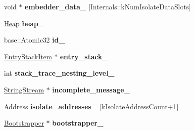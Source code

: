 \begin{DoxyCompactItemize}
\item 
void $\ast$ {\bfseries embedder\+\_\+data\+\_\+} \mbox{[}Internals\+::k\+Num\+Isolate\+Data\+Slots\mbox{]}\hypertarget{classv8_1_1internal_1_1_isolate_a6bda52e977da4e20fbc79e25a6b5922b}{}\label{classv8_1_1internal_1_1_isolate_a6bda52e977da4e20fbc79e25a6b5922b}

\item 
\hyperlink{classv8_1_1internal_1_1_heap}{Heap} {\bfseries heap\+\_\+}\hypertarget{classv8_1_1internal_1_1_isolate_ae5c81c5ae2793cfe8efebda93cbc7c01}{}\label{classv8_1_1internal_1_1_isolate_ae5c81c5ae2793cfe8efebda93cbc7c01}

\item 
base\+::\+Atomic32 {\bfseries id\+\_\+}\hypertarget{classv8_1_1internal_1_1_isolate_ad6f734be74ed7897ac5dac44d0d765b3}{}\label{classv8_1_1internal_1_1_isolate_ad6f734be74ed7897ac5dac44d0d765b3}

\item 
\hyperlink{classv8_1_1internal_1_1_isolate_1_1_entry_stack_item}{Entry\+Stack\+Item} $\ast$ {\bfseries entry\+\_\+stack\+\_\+}\hypertarget{classv8_1_1internal_1_1_isolate_a1cbaebac0c27d6c4fe0afeecd11a3b94}{}\label{classv8_1_1internal_1_1_isolate_a1cbaebac0c27d6c4fe0afeecd11a3b94}

\item 
int {\bfseries stack\+\_\+trace\+\_\+nesting\+\_\+level\+\_\+}\hypertarget{classv8_1_1internal_1_1_isolate_a6daa09f6353869331a2180a0d8d359c0}{}\label{classv8_1_1internal_1_1_isolate_a6daa09f6353869331a2180a0d8d359c0}

\item 
\hyperlink{classv8_1_1internal_1_1_string_stream}{String\+Stream} $\ast$ {\bfseries incomplete\+\_\+message\+\_\+}\hypertarget{classv8_1_1internal_1_1_isolate_ab22def3ce5f29d2085120e41b88bf1e2}{}\label{classv8_1_1internal_1_1_isolate_ab22def3ce5f29d2085120e41b88bf1e2}

\item 
Address {\bfseries isolate\+\_\+addresses\+\_\+} \mbox{[}k\+Isolate\+Address\+Count+1\mbox{]}\hypertarget{classv8_1_1internal_1_1_isolate_a84b8bca94f749229aed837e5303a55a2}{}\label{classv8_1_1internal_1_1_isolate_a84b8bca94f749229aed837e5303a55a2}

\item 
\hyperlink{classv8_1_1internal_1_1_bootstrapper}{Bootstrapper} $\ast$ {\bfseries bootstrapper\+\_\+}\hypertarget{classv8_1_1internal_1_1_isolate_af566a26a2af0d03d92bf406464f18c3e}{}\label{classv8_1_1internal_1_1_isolate_af566a26a2af0d03d92bf406464f18c3e}


\end{DoxyCompactItemize}
